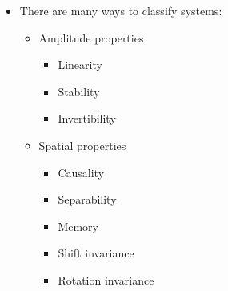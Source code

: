 \begin{itemize}[--]
	\item There are many ways to classify systems:
	\begin{itemize}[--]
		\item Amplitude properties
		\begin{itemize}[--]
			\item Linearity
			\item Stability
			\item Invertibility
		\end{itemize}

		\item Spatial properties
		\begin{itemize}[--]
			\item Causality
			\item Separability
			\item Memory
			\item Shift invariance
			\item Rotation invariance
		\end{itemize}
	\end{itemize}
\end{itemize}